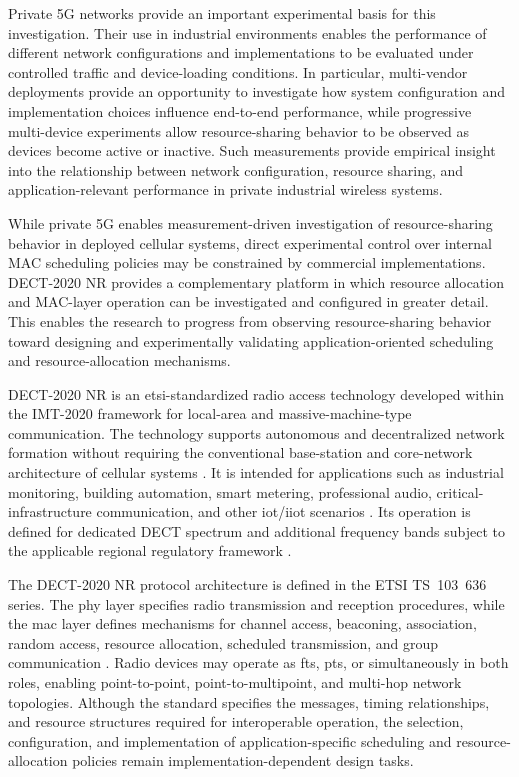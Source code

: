 \documentclass[12pt,a4paper]{article}
\begin{document}
Private 5G networks provide an important experimental basis for this
investigation. Their use in industrial environments enables the performance
of different network configurations and implementations to be evaluated under
controlled traffic and device-loading conditions. In particular, multi-vendor
deployments provide an opportunity to investigate how system configuration and
implementation choices influence end-to-end performance, while progressive
multi-device experiments allow resource-sharing behavior to be observed as
devices become active or inactive. Such measurements provide empirical insight
into the relationship between network configuration, resource sharing, and
application-relevant performance in private industrial wireless systems.

While private 5G enables measurement-driven investigation of resource-sharing
behavior in deployed cellular systems, direct experimental control over
internal MAC scheduling policies may be constrained by commercial
implementations. DECT-2020 NR provides a complementary platform in which
resource allocation and MAC-layer operation can be investigated and configured
in greater detail. This enables the research to progress from observing
resource-sharing behavior toward designing and experimentally validating
application-oriented scheduling and resource-allocation mechanisms.

DECT-2020 NR is an \gls{etsi}-standardized radio access technology developed
within the IMT-2020 framework for local-area and massive-machine-type
communication. The technology supports autonomous and decentralized network
formation without requiring the conventional base-station and core-network
architecture of cellular systems
\cite{kovalchukovDECT2020NewRadio2022,
perez-guiraoDECTNRUnveiling2022}.
It is intended for applications such as industrial monitoring, building
automation, smart metering, professional audio, critical-infrastructure
communication, and other \gls{iot}/\gls{iiot} scenarios
\cite{durreDECT2020NRProfessional2024,
poetsProfessionalNetworkedAudio2025,
biswasReliableLowLatencyCommunications2024}.
Its operation is defined for dedicated DECT spectrum and additional frequency
bands subject to the applicable regional regulatory framework
\cite{etsi_tr103943}.

The DECT-2020 NR protocol architecture is defined in the ETSI TS~103~636
series. The \gls{phy} layer specifies radio transmission and reception
procedures, while the \gls{mac} layer defines mechanisms for channel access,
beaconing, association, random access, resource allocation, scheduled
transmission, and group communication
\cite{etsi_ts103636_1,etsi_ts103636_3,etsi_ts103636_4}.
Radio devices may operate as \glspl{ft}, \glspl{pt}, or simultaneously in both
roles, enabling point-to-point, point-to-multipoint, and multi-hop network
topologies. Although the standard specifies the messages, timing relationships,
and resource structures required for interoperable operation, the selection,
configuration, and implementation of application-specific scheduling and
resource-allocation policies remain implementation-dependent design tasks.
\end{document}

